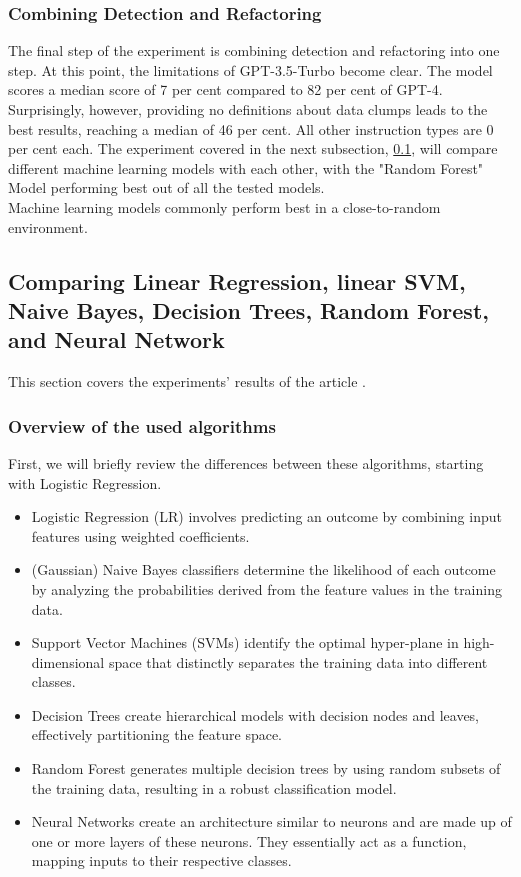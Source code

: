 \subsubsection{Combining Detection and Refactoring}
The final step of the experiment is combining detection and refactoring into one step. At this point, the limitations of GPT-3.5-Turbo become clear. The model scores a median score of 7 per cent compared to 82 per cent of GPT-4.
Surprisingly, however, providing no definitions about data clumps leads to the best results, reaching a median of 46 per cent.
All other instruction types are 0 per cent each.
The experiment covered in the next subsection, \ref{comparingAlgorithms}, will compare different machine learning models with each other, with the "Random Forest" Model performing best out of all the tested models.\\
Machine learning models commonly perform best in a close-to-random environment.
\subsection{Comparing Linear Regression, linear SVM, Naive Bayes, Decision Trees, Random Forest, and Neural Network} \label{comparingAlgorithms}
This section covers the experiments' results of the article \cite[The effectiveness of supervised machine learning algorithms in predicting software refactoring]{aniche2020effectiveness}.
\subsubsection{Overview of the used algorithms}
First, we will briefly review the differences between these algorithms, starting with Logistic Regression.
\begin{itemize}
    \item Logistic Regression (LR) \cite{biship2007pattern} involves predicting an outcome by combining input features using weighted coefficients.
    \item (Gaussian) Naive Bayes classifiers \cite{zhang2014optimality} determine the likelihood of each outcome by analyzing the probabilities derived from the feature values in the training data.
    \item Support Vector Machines (SVMs) \cite{cortes1995support} identify the optimal hyper-plane in high-dimensional space that distinctly separates the training data into different classes.
    \item Decision Trees \cite{quinlan2014c4} create hierarchical models with decision nodes and leaves, effectively partitioning the feature space.
    \item Random Forest \cite{breiman2001random} generates multiple decision trees by using random subsets of the training data, resulting in a robust classification model.
    \item Neural Networks \cite{goodfellow2016deep} create an architecture similar to neurons and are made up of one or more layers of these neurons. They essentially act as a function, mapping inputs to their respective classes.
\end{itemize}

